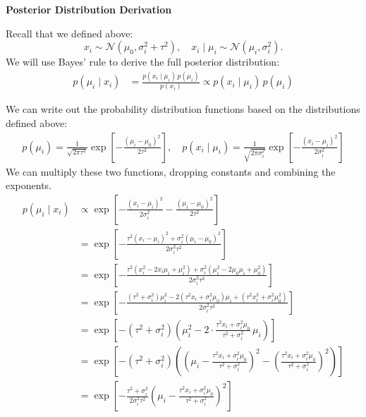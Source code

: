 \documentclass[letterpaper, 11pt]{extarticle}
\begin{document}
\textsf{\textbf{Posterior Distribution Derivation}}

Recall that we defined above:
$$x_i \sim \mathcal{N}(\mu_0, \sigma_i^2+\tau^2), \quad x_i \mid \mu_i \sim \mathcal{N}(\mu_i, \sigma_i^2).$$
We will use Bayes' rule to derive the full posterior distribution:
\begin{align}
p(\mu_i \mid x_i)
&=\frac{p(x_i \mid \mu_i)\,p(\mu_i)}{p(x_i)} \propto
p(x_i \mid \mu_i)\,p(\mu_i)
\end{align}

We can write out the probability distribution functions based on the distributions defined above:
\begin{align}
    p(\mu_i)
=
\frac{1}{\sqrt{2\pi\tau^{2}}}
\exp\!\left[
-\frac{(\mu_i - \mu_0)^2}{2\tau^{2}}
\right], \quad p(x_i \mid \mu_i)
=
\frac{1}{\sqrt{2\pi\sigma_i^{2}}}
\exp\!\left[
-\frac{(x_i - \mu_i)^2}{2\sigma_i^{2}}
\right]
\end{align}
We can multiply these two functions, dropping constants and combining the exponents.  
\begin{align}
p(\mu_i \mid x_i)
&\propto
\exp\!\left[
-\frac{(x_i - \mu_i)^2}{2\sigma_i^{2}}
-
\frac{(\mu_i - \mu_0)^2}{2\tau^{2}}
\right]
\\[1.2ex]
&=
\exp\!\left[
-\frac{
\tau^{2}(x_i - \mu_i)^{2}
+
\sigma_i^{2}(\mu_i - \mu_0)^{2}
}{
2\sigma_i^{2}\tau^{2}
}
\right]
\\[1.2ex]
&=
\exp\!\left[
-\frac{
\tau^{2}(x_i^{2} - 2x_i\mu_i + \mu_i^{2})
+
\sigma_i^{2}(\mu_i^{2} - 2\mu_0\mu_i + \mu_0^{2})
}{
2\sigma_i^{2}\tau^{2}
}
\right]
\\[1.2ex]
&=
\exp\!\left[
-\frac{
(\tau^{2} + \sigma_i^{2})\mu_i^{2}
-
2(\tau^{2}x_i + \sigma_i^{2}\mu_0)\mu_i
+
(\tau^{2}x_i^{2} + \sigma_i^{2}\mu_0^{2})
}{
2\sigma_i^{2}\tau^{2}
}
\right]\\
&=\exp\!\left[
-(\tau^{2} + \sigma_i^{2})
\left(
\mu_i^{2}
-
2\cdot
\frac{\tau^{2} x_i + \sigma_i^{2} \mu_0}{\tau^{2} + \sigma_i^{2}}
\,\mu_i
\right)
\right]
\\[1.3ex]
&=
\exp\!\left[
-(\tau^{2} + \sigma_i^{2})
\left(
\left(
\mu_i
-
\frac{\tau^{2} x_i + \sigma_i^{2} \mu_0}{\tau^{2} + \sigma_i^{2}}
\right)^{2}
-
\left(
\frac{\tau^{2} x_i + \sigma_i^{2} \mu_0}{\tau^{2} + \sigma_i^{2}}
\right)^{2}
\right)
\right]
\\[1.3ex]
&=
\exp\!\left[
-\frac{\tau^{2} + \sigma_i^{2}}{2\sigma_i^{2}\tau^{2}}
\left(
\mu_i
-
\frac{\tau^{2} x_i + \sigma_i^{2} \mu_0}{\tau^{2} + \sigma_i^{2}}
\right)^{2}
\right]
\end{align}
\end{document}
